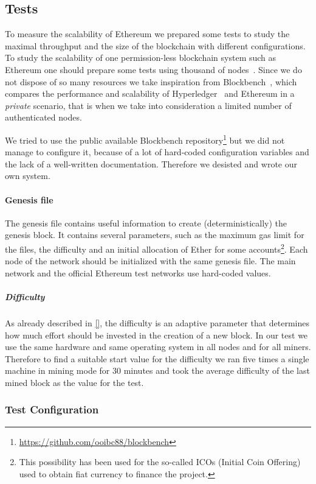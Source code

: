 \subsection{Tests}

To measure the scalability of Ethereum we prepared some tests to study
the maximal throughput and the size of the blockchain with different
configurations.
To study the scalability of one permission-less blockchain system such as
Ethereum one should prepare some tests using thousand of nodes~\cite{}.
Since we do not dispose of so many resources we take inspiration from
Blockbench~\cite{blockbench}, which compares the performance and scalability
of Hyperledger~\cite{} and Ethereum in a \emph{private} scenario, that is when 
we take into consideration a limited number of authenticated nodes.

We tried to use the public available Blockbench 
repository\footnote{\url{https://github.com/ooibc88/blockbench}}
but we did not manage to configure it, because of a lot of hard-coded
configuration variables and the lack of a well-written documentation.
Therefore we desisted and wrote our own system.



\paragraph{Genesis file}

The genesis file contains useful information to create (deterministically)
the genesis block. It contains several parameters, such as the maximum
gas limit for the files, the difficulty and an initial allocation of Ether
for some accounts\footnote{This possibility has been used for the so-called
ICOs (Initial Coin Offering) used to obtain fiat currency to finance
the project.}. Each node of the network should be initialized with
the same genesis file. The main network and the official Ethereum test
networks use hard-coded values.

\subparagraph{Difficulty}
As already described in \autoref{}, the difficulty is an adaptive parameter 
that determines how much effort should be invested in the creation of a new
block.
In our test we use the same hardware and same operating system in all nodes
and for all miners.
Therefore to find a suitable start value for the difficulty we ran five times 
a single machine in mining mode for 30 minutes and took the average difficulty
of the last mined block as the value for the test.


\subsubsection{Test Configuration}


